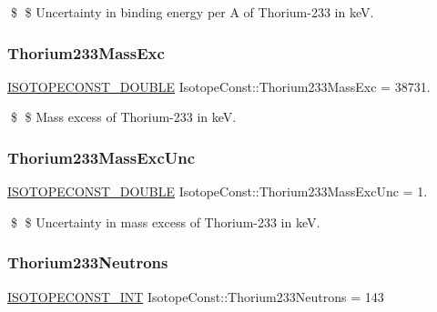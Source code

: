 \$ \$ Uncertainty in binding energy per A of Thorium-\/233 in keV. \mbox{\label{group___isotope_const-_thorium-_th233_gabca007e006ad682f1c1d94c09aa1792d}} 
\subsubsection{\texorpdfstring{Thorium233\+Mass\+Exc}{Thorium233MassExc}}
{\footnotesize\ttfamily \mbox{\hyperlink{group___isotope_const-_macros_ga8f45a7272ce02c0b4c65c44636ed719a}{I\+S\+O\+T\+O\+P\+E\+C\+O\+N\+S\+T\+\_\+\+D\+O\+U\+B\+LE}} Isotope\+Const\+::\+Thorium233\+Mass\+Exc = 38731.}

\$ \$ Mass excess of Thorium-\/233 in keV. \mbox{\label{group___isotope_const-_thorium-_th233_ga4765108823de294d8508c67279247a42}} 
\subsubsection{\texorpdfstring{Thorium233\+Mass\+Exc\+Unc}{Thorium233MassExcUnc}}
{\footnotesize\ttfamily \mbox{\hyperlink{group___isotope_const-_macros_ga8f45a7272ce02c0b4c65c44636ed719a}{I\+S\+O\+T\+O\+P\+E\+C\+O\+N\+S\+T\+\_\+\+D\+O\+U\+B\+LE}} Isotope\+Const\+::\+Thorium233\+Mass\+Exc\+Unc = 1.}

\$ \$ Uncertainty in mass excess of Thorium-\/233 in keV. \mbox{\label{group___isotope_const-_thorium-_th233_ga5639b3a1acfbee5b19fce29b91d47fe0}} 
\subsubsection{\texorpdfstring{Thorium233\+Neutrons}{Thorium233Neutrons}}
{\footnotesize\ttfamily \mbox{\hyperlink{group___isotope_const-_macros_ga5f18360b3e99483a35c32d789e62621c}{I\+S\+O\+T\+O\+P\+E\+C\+O\+N\+S\+T\+\_\+\+I\+NT}} Isotope\+Const\+::\+Thorium233\+Neutrons = 143}

